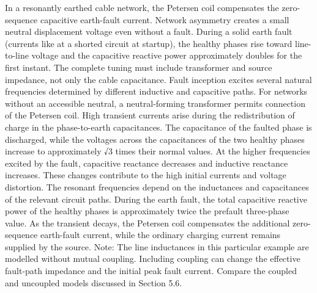 \begin{chaptersummary}
In a resonantly earthed cable network, the Petersen coil compensates the
zero-sequence capacitive earth-fault current. Network asymmetry creates a small
neutral displacement voltage even without a fault. During a solid earth fault (currents like at a shorted circuit at startup),
the healthy phases rise toward line-to-line voltage and the capacitive reactive
power approximately doubles for the first instant. The complete tuning must include transformer and
source impedance, not only the cable capacitance. Fault inception excites
several natural frequencies determined by different inductive and capacitive
paths. For networks without an accessible neutral, a neutral-forming
transformer permits connection of the Petersen coil.
High transient currents arise during the redistribution of charge in the phase-to-earth capacitances. The capacitance of the faulted phase is discharged, while the voltages across the capacitances of the two healthy phases increase to approximately √3 times their normal values. At the higher frequencies excited by the fault, capacitive reactance decreases and inductive reactance increases. These changes contribute to the high initial currents and voltage distortion. The resonant frequencies depend on the inductances and capacitances of the relevant circuit paths.
During the earth fault, the total capacitive reactive power of the healthy phases is approximately twice the prefault three-phase value. As the transient decays, the Petersen coil compensates the additional zero-sequence earth-fault current, while the ordinary charging current remains supplied by the source.
Note: The line inductances in this particular example are modelled without mutual coupling. Including coupling can change the effective fault-path impedance and the initial peak fault current. Compare the coupled and uncoupled models discussed in Section 5.6.
\end{chaptersummary}
